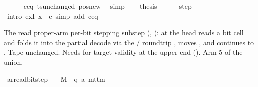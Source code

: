 \begin{isabellebody}
\ \ \ \ \isamarkupfalse%
\ c{\isacharprime}{\kern0pt}{\isacharunderscore}{\kern0pt}eq\ ts{\isacharunderscore}{\kern0pt}unchanged\ pos{\isacharunderscore}{\kern0pt}new\ \isamarkupfalse%
\ simp\isanewline
\ \ \isamarkupfalse%
\ {\isacharquery}{\kern0pt}thesis\isanewline
\ \ \ \ \isamarkupfalse%
\ step\ \isamarkupfalse%
\ {\isacharparenleft}{\kern0pt}intro\ exI{\isacharbrackleft}{\kern0pt}\ x\ {\isacharequal}{\kern0pt}\ {\isacharquery}{\kern0pt}c{\isacharprime}{\kern0pt}{\isacharprime}{\kern0pt}{\isacharbrackright}{\kern0pt}{\isacharparenright}{\kern0pt}\ {\isacharparenleft}{\kern0pt}simp\ add{\isacharcolon}{\kern0pt}\ c{\isacharprime}{\kern0pt}{\isacharunderscore}{\kern0pt}eq{\isacharparenright}{\kern0pt}\isanewline
{}\isamarkupfalse%
%
\endisatagproof
{\isafoldproof}%
%
\isadelimproof
%
\endisadelimproof
%
\begin{isamarkuptext}%
The read proper-arm per-bit stepping substep
  (, ): at
   the head reads a bit cell and folds it
  into the partial decode via the /
  roundtrip ,
  moves , and continues to .  Tape unchanged.  Needs
   for target validity at the upper end
  ().  Arm 5 of the union.%
\end{isamarkuptext}\isamarkuptrue%
\isamarkupfalse%
\ ar{\isacharunderscore}{\kern0pt}read{\isacharunderscore}{\kern0pt}bit{\isacharunderscore}{\kern0pt}step{\isacharcolon}{\kern0pt}\isanewline
\ \ \ M\ {\isacharcolon}{\kern0pt}{\isacharcolon}{\kern0pt}\ {\isachardoublequoteopen}{\isacharparenleft}{\kern0pt}{\isacharprime}{\kern0pt}q{\isacharcomma}{\kern0pt}\ {\isacharprime}{\kern0pt}a{\isacharparenright}{\kern0pt}\ mttm{\isachardoublequoteclose}\isanewline

\end{isabellebody}

